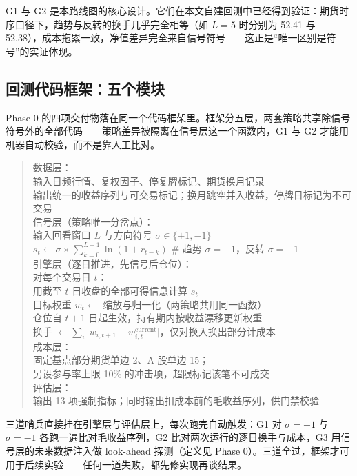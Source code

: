 G1 与 G2 是本路线图的核心设计。它们在本文自建回测中已经得到验证：期货时序口径下，趋势与反转的换手几乎完全相等（如 $L=5$ 时分别为 52.41 与 52.38），成本拖累一致，净值差异完全来自信号符号——这正是“唯一区别是符号”的实证体现。

\subsection{回测代码框架：五个模块}

Phase 0 的四项交付物落在同一个代码框架里。框架分五层，两套策略共享除信号符号外的全部代码——策略差异被隔离在信号层这一个函数内，G1 与 G2 才能用机器自动校验，而不是靠人工比对。

\begin{quote}\ttfamily\small
数据层：\\
\quad 输入日频行情、复权因子、停复牌标记、期货换月记录\\
\quad 输出统一的收益序列与可交易标记；换月跳空并入收益，停牌日标记为不可交易\\[2pt]
信号层（策略唯一分岔点）：\\
\quad 输入回看窗口 $L$ 与方向符号 $\sigma\in\{+1,-1\}$\\
\quad $s_t \gets \sigma\times\sum_{k=0}^{L-1}\ln(1+r_{t-k})$ \hfill \# 趋势 $\sigma=+1$，反转 $\sigma=-1$\\[2pt]
引擎层（逐日推进，先信号后仓位）：\\
\quad 对每个交易日 $t$：\\
\qquad 用截至 $t$ 日收盘的全部可得信息计算 $s_t$\\
\qquad 目标权重 $w_t \gets$ 缩放与归一化（两策略共用同一函数）\\
\qquad 仓位自 $t+1$ 日起生效，持有期内按收益漂移更新权重\\
\qquad 换手 $\gets\sum_i\bigl|w_{i,t+1}-w^{\mathrm{current}}_{i,t}\bigr|$，仅对换入换出部分计成本\\[2pt]
成本层：\\
\quad 固定基点部分期货单边 2、A 股单边 15；\\
\quad 另设参与率上限 10\% 的冲击项，超限标记该笔不可成交\\[2pt]
评估层：\\
\quad 输出 13 项强制指标；同时输出扣成本前的毛收益序列，供门禁校验\\
\end{quote}

三道哨兵直接挂在引擎层与评估层上，每次跑完自动触发：G1 对 $\sigma=+1$ 与 $\sigma=-1$ 各跑一遍比对毛收益序列，G2 比对两次运行的逐日换手与成本，G3 用信号层的未来数据注入做 look-ahead 探测（定义见 Phase 0）。三道全过，框架才可用于后续实验——任何一道失败，都先修实现再谈结果。

